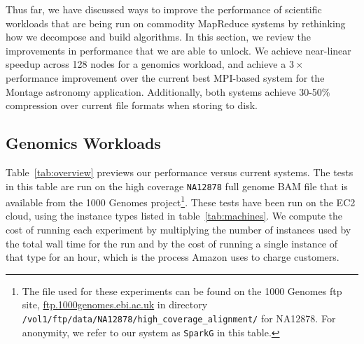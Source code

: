 \documentclass{acm_proc_article-sp}
\begin{document}
Thus far, we have discussed ways to improve the performance of scientific workloads that are
being run on commodity MapReduce systems by rethinking how we decompose and build algorithms.
In this section, we review the improvements in performance that we are able to unlock. We achieve
near-linear speedup across 128 nodes for a genomics workload, and achieve a $3\times$ performance
improvement over the current best MPI-based system for the Montage astronomy application.
Additionally, both systems achieve 30-50\% compression over current file formats when storing to disk.

\subsection{Genomics Workloads}
\label{sec:genomics-performance}

Table~\ref{tab:overview} previews our performance versus current systems. The tests in this table are run on the
high coverage \texttt{NA12878} full genome BAM file that is available from the 1000 Genomes
project\footnote{The file used for these experiments can be found on the
1000 Genomes ftp site, \url{ftp.1000genomes.ebi.ac.uk} in directory 
\texttt{/vol1/ftp/data/NA12878/high\_coverage\_alignment/} for NA12878. For anonymity, we refer to our system
as \texttt{SparkG} in this table.}. These tests have been run on the EC2  cloud, using the instance types listed in
table~\ref{tab:machines}. We compute the cost of running each experiment by multiplying the number of instances
used by the total wall time for the run and by the cost of running a single instance of that type for an hour, which is
the process Amazon uses to charge customers.
\end{document}
